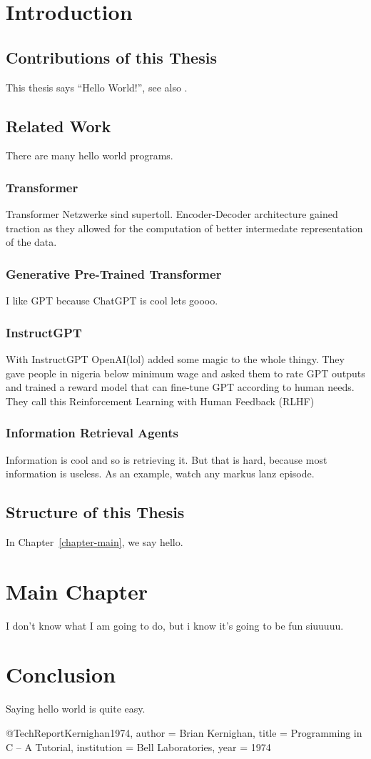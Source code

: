 \documentclass[english, version-2022-01]{uzl-thesis}
\begin{document}
\chapter{Introduction}
\section{Contributions of this Thesis}
This thesis says ``Hello World!'', see also \cite{Kernighan1974}.
\section{Related Work}
There are many hello world programs.

\subsection{Transformer}
Transformer Netzwerke sind supertoll. Encoder-Decoder architecture gained traction as they allowed for the computation of better intermedate representation of the data.
\subsection{Generative Pre-Trained Transformer}
I like GPT because ChatGPT is cool lets goooo.

\subsection{InstructGPT}
With InstructGPT OpenAI(lol) added some magic to the whole thingy. They gave people in nigeria below minimum wage and asked them to rate GPT outputs and trained a reward model that can fine-tune GPT according to human needs. They call this Reinforcement Learning with Human Feedback (RLHF)

\subsection{Information Retrieval Agents}
Information is cool and so is retrieving it. But that is hard, because most information is useless. As an example, watch any markus lanz episode.
\section{Structure of this Thesis}

In Chapter~\vref{chapter-main}, we say hello.
\chapter{Main Chapter}
\label{chapter-main}
I don't know what I am going to do, but i know it's going to be fun siuuuuu.
\chapter{Conclusion}
Saying hello world is quite easy.
\begin{bibtex-entries}
@TechReport{Kernighan1974,
	author = {Brian Kernighan},
	title = {Programming in C – A Tutorial},
	institution = {Bell Laboratories},
	year = {1974}
}
\end{bibtex-entries}
\end{document}
